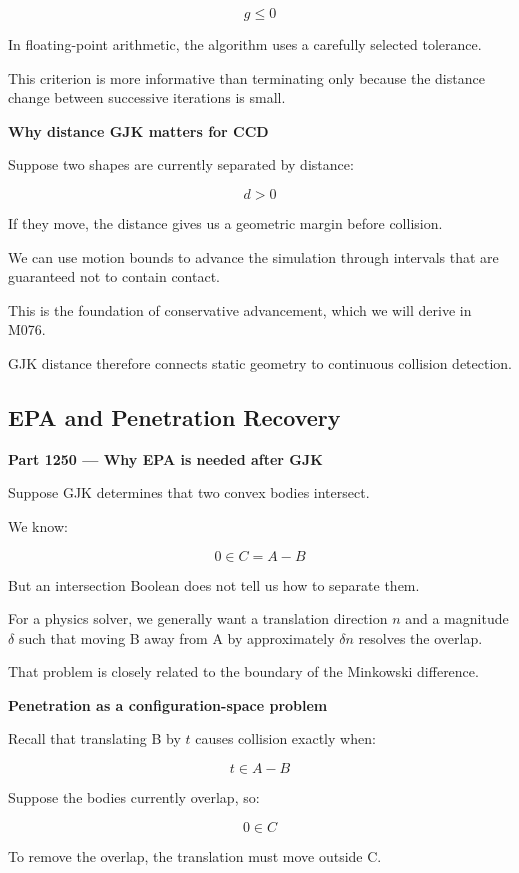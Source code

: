 \[
g\le0
\]

In floating-point arithmetic, the algorithm uses a carefully selected tolerance.

This criterion is more informative than terminating only because the distance change between successive iterations is small.

\textbf{Why distance GJK matters for CCD}

Suppose two shapes are currently separated by distance:

\[
d>0
\]

If they move, the distance gives us a geometric margin before collision.

We can use motion bounds to advance the simulation through intervals that are guaranteed not to contain contact.

This is the foundation of conservative advancement, which we will derive in M076.

GJK distance therefore connects static geometry to continuous collision detection.

\subsection{EPA and Penetration Recovery}\label{04-visual-computing-ii-ch025-epa-and-penetration-recovery}

\textbf{Part 1250 --- Why EPA is needed after GJK}

Suppose GJK determines that two convex bodies intersect.

We know:

\[
0\in C=A-B
\]

But an intersection Boolean does not tell us how to separate them.

For a physics solver, we generally want a translation direction \(n\) and a magnitude \(\delta\) such that moving B away from A by approximately \(\delta n\) resolves the overlap.

That problem is closely related to the boundary of the Minkowski difference.

\textbf{Penetration as a configuration-space problem}

Recall that translating B by \(t\) causes collision exactly when:

\[
t\in A-B
\]

Suppose the bodies currently overlap, so:

\[
0\in C
\]

To remove the overlap, the translation must move outside C.

